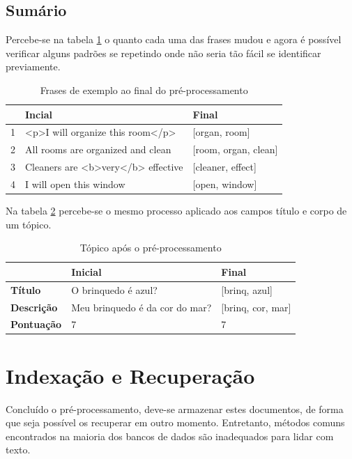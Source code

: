 \subsection{Sumário}
Percebe-se na tabela \ref{tab:allphrases} o quanto cada uma das frases mudou e agora é possível verificar alguns padrões se repetindo onde não seria tão fácil se identificar previamente.
\begin{table}[htb]
	\centering
    \def\arraystretch{1.2} %
    \begin{tabular}{|l|l|l|}
        \hline
        & \textbf{Incial} & \textbf{Final} \\ \hline
        1 & <p>I will organize this room</p>  & [organ, room]            \\ \hline
        2 & All rooms are organized and clean  & [room, organ, clean] \\ \hline
        3 & Cleaners are <b>very</b> effective  & [cleaner, effect]                              \\ \hline
        4 & I will open this window  & [open, window]                             \\ \hline
    \end{tabular}
	\caption{Frases de exemplo ao final do pré-processamento}
    \label{tab:allphrases}
\end{table}

 Na tabela \ref{tab:quenstionpreprocessed} percebe-se o mesmo processo aplicado aos campos título e corpo de um tópico.

\begin{table}[htb]
	\centering
    \def\arraystretch{1.2} %
    \begin{tabular}{|l|l|l|}
        \hline
        & \textbf{Inicial} & \textbf{Final} \\ \hline
        \textbf{Título}              & O brinquedo é azul?            & [brinq, azul] \\ \hline
        \textbf{Descrição}               & Meu brinquedo é da cor do mar? & [brinq, cor, mar] \\ \hline
        \textbf{Pontuação}           & 7                              & 7 \\ \hline
    \end{tabular}
	\caption{Tópico após o pré-processamento}
    \label{tab:quenstionpreprocessed}
\end{table}     
\section{Indexação e Recuperação}
Concluído o pré-processamento, deve-se armazenar estes documentos, de forma que seja possível os recuperar em outro momento. Entretanto, métodos comuns encontrados na maioria dos bancos de dados são inadequados para lidar com texto.

